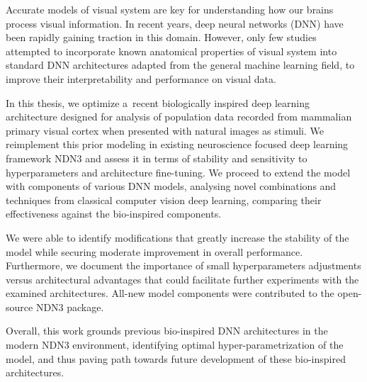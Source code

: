 \documentclass[12pt]{report}
\begin{document}

Accurate models of visual system are key for understanding how our brains process visual information. In recent years, deep neural networks (DNN) have been rapidly gaining traction in this domain. However, only few studies attempted to incorporate known anatomical properties of visual system into standard DNN architectures adapted from the general machine learning field, to improve their interpretability and performance on visual data.

In this thesis, we optimize a~recent biologically inspired deep learning architecture designed for analysis of population data recorded from mammalian primary visual cortex when presented with natural images as stimuli. We reimplement this prior modeling in existing neuroscience focused deep learning framework NDN3 and assess it in terms of stability and sensitivity to hyperparameters and architecture fine-tuning. We proceed to extend the model with components of various DNN models, analysing novel combinations and techniques from classical computer vision deep learning, comparing their effectiveness against the bio-inspired components. 

We were able to identify modifications that greatly increase the stability of the model while securing moderate improvement in overall performance. Furthermore, we document the importance of small hyperparameters adjustments versus architectural advantages that could facilitate further experiments with the examined architectures. All-new model components were contributed to the open-source NDN3 package. 

Overall, this work grounds previous bio-inspired DNN architectures in the modern NDN3 environment, identifying optimal hyper-parametrization of the model, and thus paving path towards future development of these bio-inspired architectures.
\end{document}
